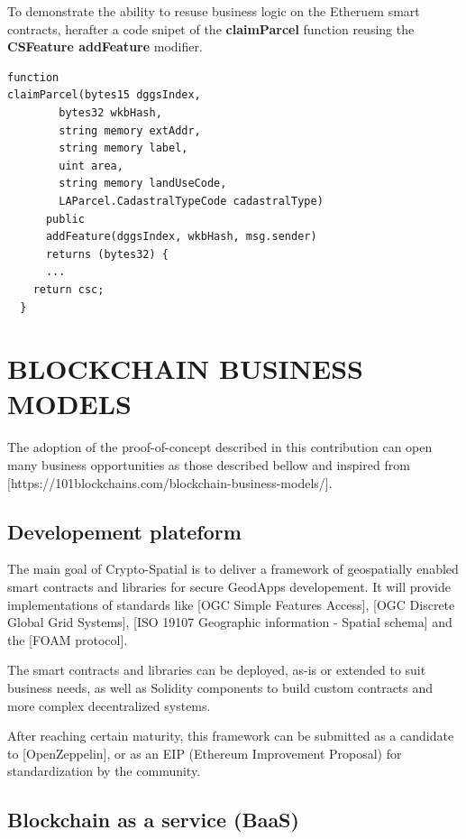 \documentclass{isprs} %
\begin{document}
To demonstrate the ability to resuse business logic on the Etheruem smart contracts, herafter a code snipet of the \textbf{claimParcel} function reusing the \textbf{CSFeature addFeature} modifier.
\begin{verbatim}
function 
claimParcel(bytes15 dggsIndex,
		bytes32 wkbHash,
		string memory extAddr,
		string memory label,
		uint area,
		string memory landUseCode,
		LAParcel.CadastralTypeCode cadastralType)
      public 
      addFeature(dggsIndex, wkbHash, msg.sender)
      returns (bytes32) {
      ...
    return csc;
  }
\end{verbatim}

\newpage

\section{BLOCKCHAIN BUSINESS MODELS}\label{sec:BLOCKCHAIN BUSINESS MODELS}

The adoption of the proof-of-concept described in this contribution can open many business opportunities as those described bellow and inspired from [https://101blockchains.com/blockchain-business-models/].

\subsection{Developement plateform}\label{sec:Developement plateform}

The main goal of Crypto-Spatial is to deliver a framework of geospatially enabled smart contracts and libraries for secure GeodApps developement. It will provide implementations of standards like [OGC Simple Features Access], [OGC Discrete Global Grid Systems], [ISO 19107 Geographic information - Spatial schema] and the [FOAM protocol].

The smart contracts and libraries can be deployed, as-is or extended to suit business needs, as well as Solidity components to build custom contracts and more complex decentralized systems. 

After reaching certain maturity, this framework can be submitted as a candidate to [OpenZeppelin], or as an EIP (Ethereum Improvement Proposal) for standardization by the community.

\subsection{Blockchain as a service (BaaS)}\label{sec:Blockchain as a service (BaaS)}
\end{document}

